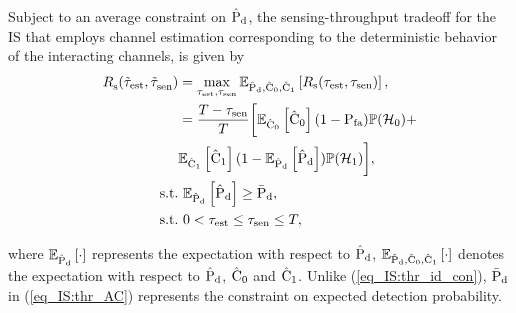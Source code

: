 \begin{theorem} \label{th_IS:th1}
\normalfont
Subject to an average constraint on $\epd$, the sensing-throughput tradeoff for the IS that employs channel estimation corresponding to the deterministic behavior of the interacting channels, is given by  
\begin{align}
\trsac(\ttest, \ttsenac) &= \maxi_{\tc{\test}, \tsen} \e{\epd, \ecz, \eco}{\rs(\test, \tsen)}, \nonumber \\ 
\quad &= \frac{T- \tsen}{T} \bigg[ \e{\ecz}{\ecz} (1 - \pfa) \phz + \nonumber \\ \quad & \e{\eco}{\eco} (1 - \e{\epd}{\epd}) \pho  \bigg], \label{eq_IS:thr_AC} \\
\text{s.t.} & \text{ }  \e{\epd}{\epd} \ge \pdd, \label{eq_IS:AC} \\
\tc{\text{s.t.}} & \text{ }  \tc{0 < \test \le \tsen \le T,} \nonumber
\end{align}
\end{theorem} 
where $\e{\epd}{\cdot}$ represents the expectation with respect to $\epd$, $\e{\epd, \ecz, \eco}{\cdot}$ denotes the expectation with respect to $\epd$, $\ecz$ and $\eco$. Unlike (\ref{eq_IS:thr_id_con}), $\pdd$ in (\ref{eq_IS:thr_AC}) represents the constraint on expected detection probability.

\begin{IEEEproof} 
\end{IEEEproof}

